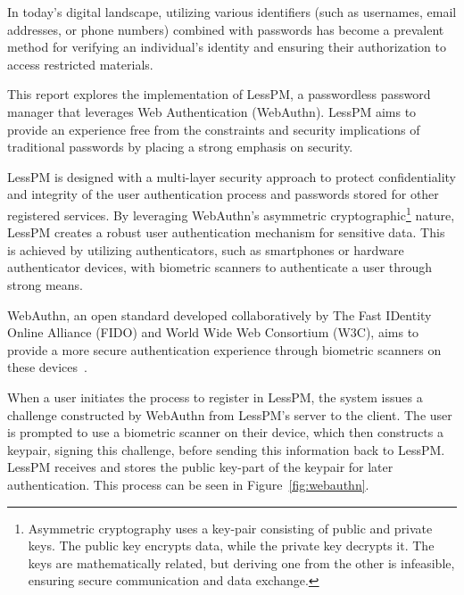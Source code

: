 
In today's digital landscape, utilizing various identifiers (such as usernames,
email addresses, or phone numbers) combined with passwords has become a
prevalent method for verifying an individual's identity and ensuring their
authorization to access restricted materials.

This report explores the implementation of LessPM, a passwordless password
manager that leverages Web Authentication (WebAuthn).
LessPM aims to provide an experience free from the constraints and security
implications of traditional passwords by placing a strong emphasis on
security.

LessPM is designed with a multi-layer security approach to protect
confidentiality and integrity of the user authentication process and passwords
stored for other registered services.
By leveraging WebAuthn's asymmetric cryptographic\footnote{
  Asymmetric cryptography uses a key-pair consisting of public and private
  keys.
  The public key encrypts data, while the private key decrypts it.
  The keys are mathematically related, but deriving one from the other is
  infeasible, ensuring secure communication and data exchange.
} nature, LessPM creates a robust user authentication mechanism for sensitive
data.
This is achieved by utilizing authenticators, such as smartphones or
hardware authenticator devices, with biometric scanners to authenticate a
user through strong means.

WebAuthn, an open standard developed collaboratively by The Fast IDentity
Online Alliance (FIDO) and World Wide Web Consortium (W3C), aims to provide a
more secure authentication experience through biometric scanners on these
devices~\cite{webauthn-2}.

When a user initiates the process to register in LessPM, the system issues a
challenge constructed by WebAuthn from LessPM's server to the client.
The user is prompted to use a biometric scanner on their device, which then
constructs a keypair, signing this challenge, before sending this information
back to LessPM\@.
LessPM receives and stores the public key-part of the keypair for later
authentication.
This process can be seen in Figure~\ref{fig:webauthn}.

